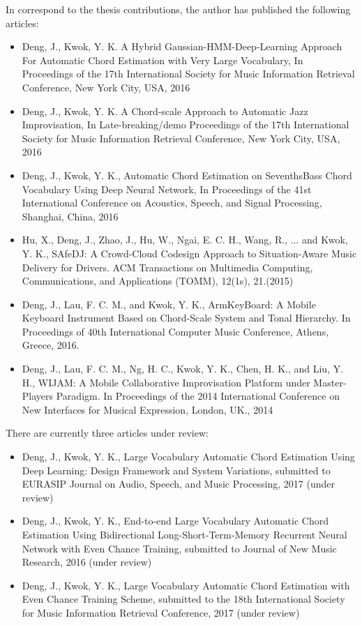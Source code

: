 In correspond to the thesis contributions, the author has published the following articles:
\begin{itemize}
\item Deng, J., Kwok, Y. K. A Hybrid Gaussian-HMM-Deep-Learning Approach For Automatic Chord Estimation with Very Large Vocabulary, In Proceedings of the 17th International Society for Music Information Retrieval Conference, New York City, USA, 2016
\item Deng, J., Kwok, Y. K. A Chord-scale Approach to Automatic Jazz Improvisation, In Late-breaking/demo Proceedings of the 17th International Society for Music Information Retrieval Conference, New York City, USA, 2016
\item Deng, J., Kwok, Y. K., Automatic Chord Estimation on SeventhsBass Chord Vocabulary Using Deep Neural Network, In Proceedings of the 41st International Conference on Acoustics, Speech, and Signal Processing, Shanghai, China, 2016
\item Hu, X., Deng, J., Zhao, J., Hu, W., Ngai, E. C. H., Wang, R., ... and Kwok, Y. K., SAfeDJ: A Crowd-Cloud Codesign Approach to Situation-Aware Music Delivery for Drivers. ACM Transactions on Multimedia Computing, Communications, and Applications (TOMM), 12(1s), 21.(2015)
\item Deng, J., Lau, F. C. M., and Kwok, Y. K., ArmKeyBoard: A Mobile Keyboard Instrument Based on Chord-Scale System and Tonal Hierarchy. In Proceedings of 40th International Computer Music Conference, Athens, Greece, 2016.
\item Deng, J., Lau, F. C. M., Ng, H. C., Kwok, Y. K., Chen, H. K., and Liu, Y. H., WIJAM: A Mobile Collaborative Improvisation Platform under Master-Players Paradigm. In Proceedings of the 2014 International Conference on New Interfaces for Musical Expression, London, UK., 2014
\end{itemize}

There are currently three articles under review:
\begin{itemize}
\item Deng, J., Kwok, Y. K., Large Vocabulary Automatic Chord Estimation Using Deep Learning: Design Framework and System Variations, submitted to EURASIP Journal on Audio, Speech, and Music Processing, 2017 (under review)
\item Deng, J., Kwok, Y. K., End-to-end Large Vocabulary Automatic Chord Estimation Using Bidirectional Long-Short-Term-Memory Recurrent Neural Network with Even Chance Training, submitted to Journal of New Music Research, 2016 (under review)
\item Deng, J., Kwok, Y. K., Large Vocabulary Automatic Chord Estimation with Even Chance Training Scheme, submitted to the 18th International Society for Music Information Retrieval Conference, 2017 (under review)
\end{itemize}



